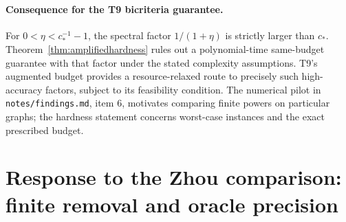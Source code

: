 \documentclass[11pt]{article}
\begin{document}
\paragraph{Consequence for the T9 bicriteria guarantee.}
For $0<\eta<c_*^{-1}-1$, the spectral factor $1/(1+\eta)$ is
strictly larger than $c_*$. Theorem~\ref{thm:amplifiedhardness} rules out a
polynomial-time same-budget guarantee with that factor under the
stated complexity assumptions. T9's augmented budget provides a
resource-relaxed route to precisely such high-accuracy factors,
subject to its feasibility condition. The numerical pilot in
\texttt{notes/findings.md}, item 6, motivates comparing finite
powers on particular graphs; the hardness statement concerns
worst-case instances and the exact prescribed budget.

\section{Response to the Zhou comparison: finite removal and oracle precision}
\end{document}
